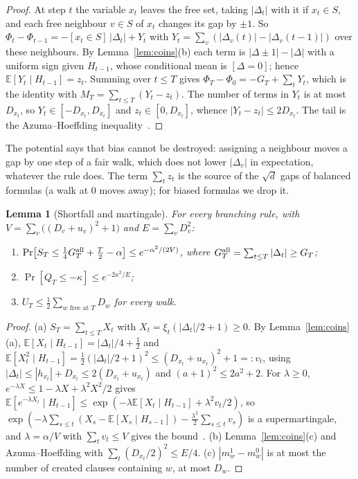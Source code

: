 \documentclass[11pt,a4paper]{article}
\newtheorem{lemma}[theorem]{Lemma}
\theoremstyle{definition}
\theoremstyle{remark}
\newcommand{\E}{\mathbb{E}}
\begin{document}
\begin{proof}
At step $t$ the variable $x_t$ leaves the free set, taking $|\Delta_t|$ with it
if $x_t\in S$, and each free neighbour $v\in S$ of $x_t$ changes its gap by
$\pm1$. So $\Phi_t-\Phi_{t-1}=-[x_t\in S]\,|\Delta_t|+Y_t$ with
$Y_t=\sum_v(|\Delta_v(t)|-|\Delta_v(t-1)|)$ over these neighbours. By
Lemma~\ref{lem:coins}(b) each term is $|\Delta\pm1|-|\Delta|$ with a uniform
sign given $H_{t-1}$, whose conditional mean is $[\Delta=0]$; hence
$\E[Y_t\mid H_{t-1}]=z_t$. Summing over $t\le T$ gives
$\Phi_T-\Phi_0=-G_T+\sum_tY_t$, which is the identity with
$M_T=\sum_{t\le T}(Y_t-z_t)$. The number of terms in $Y_t$ is at most
$D_{x_t}$, so $Y_t\in[-D_{x_t},D_{x_t}]$ and $z_t\in[0,D_{x_t}]$, whence
$|Y_t-z_t|\le2D_{x_t}$. The tail is the Azuma--Hoeffding
inequality~\cite{Azu67,Hoe63}.
\end{proof}

The potential says that bias cannot be destroyed: assigning a neighbour moves
a gap by one step of a fair walk, which does not lower $|\Delta_v|$ in
expectation, whatever the rule does. The term $\sum_tz_t$ is the source of the
$\sqrt d$ gaps of balanced formulas (a walk at $0$ moves away); for biased
formulas we drop it.

\begin{lemma}[Shortfall and martingale]\label{lem:tails}
For every branching rule, with $V=\sum_{v}\bigl((D_v+u_v)^2+1\bigr)$ and
$E=\sum_vD_v^2$:
\begin{enumerate}
 \item[(a)] $\Pr\bigl[S_T\le\tfrac14G^{\rm all}_T+\tfrac T2-\alpha\bigr]\le
 e^{-\alpha^2/(2V)}$, where $G^{\rm all}_T=\sum_{t\le T}|\Delta_t|\ge G_T$;
 \item[(b)] $\Pr[Q_T\le-\kappa]\le e^{-2\kappa^2/E}$;
 \item[(c)] $U_T\le\frac12\sum_{w\text{ free at }T}D_w$ for every walk.
\end{enumerate}
\end{lemma}

\begin{proof}
(a) $S_T=\sum_{t\le T}X_t$ with $X_t=\xi_t(|\Delta_t|/2+1)\ge0$. By
Lemma~\ref{lem:coins}(a), $\E[X_t\mid H_{t-1}]=|\Delta_t|/4+\frac12$ and
$\E[X_t^2\mid H_{t-1}]=\frac12(|\Delta_t|/2+1)^2\le(D_{x_t}+u_{x_t})^2+1=:v_t$,
using $|\Delta_t|\le|h_{x_t}|+D_{x_t}\le2(D_{x_t}+u_{x_t})$ and
$(a+1)^2\le2a^2+2$. For $\lambda\ge0$, $e^{-\lambda X}\le1-\lambda X+\lambda^2X^2/2$
gives $\E[e^{-\lambda X_t}\mid H_{t-1}]\le\exp(-\lambda\E[X_t\mid H_{t-1}]
+\lambda^2v_t/2)$, so $\exp(-\lambda\sum_{s\le t}(X_s-\E[X_s\mid H_{s-1}])
-\frac{\lambda^2}2\sum_{s\le t}v_s)$ is a supermartingale, and $\lambda=\alpha/V$
with $\sum_tv_t\le V$ gives the bound~\cite{Mau03}. (b) Lemma~\ref{lem:coins}(c)
and Azuma--Hoeffding with $\sum_t(D_{x_t}/2)^2\le E/4$. (c) $|m^1_w-m^0_w|$ is
at most the number of created clauses containing $w$, at most $D_w$.
\end{proof}
\end{document}
